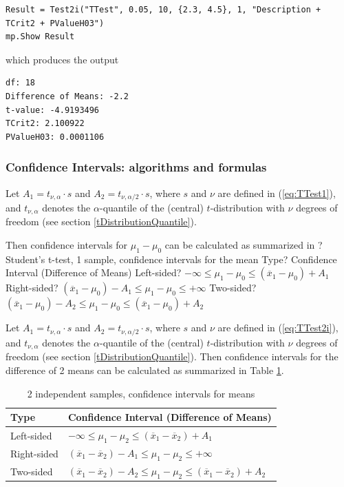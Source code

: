 \begin{lstlisting}
Result = Test2i("TTest", 0.05, 10, {2.3, 4.5}, 1, "Description + TCrit2 + PValueH03")
mp.Show Result
\end{lstlisting}
which produces the output

\begin{verbatim}
df: 18
Difference of Means: -2.2
t-value: -4.9193496
TCrit2: 2.100922
PValueH03: 0.0001106
\end{verbatim}




\subsubsection{Confidence Intervals: algorithms and formulas}
\label{1SampleTTest_CI}

Let $A_1=t_{\nu,\alpha} \cdot s$ and $A_2=t_{\nu,\alpha/2} \cdot s$, where $s$ and $\nu$ are defined in (\ref{eq:TTest1}), and $t_{\nu,\alpha}$ denotes the $\alpha$-quantile of the (central) $t$-distribution with $\nu$ degrees of freedom (see section \ref{tDistributionQuantile}). 


\mpTableTwoColsThreeRows
{Then confidence intervals for $\mu_1 - \mu_0$ can be calculated as summarized in ? Student's t-test, 1 sample, confidence intervals for the mean}
{Type? Confidence Interval (Difference of Means)}
{Left-sided? $-\infty \leq \mu_1 - \mu_0 \leq (\overline{x}_1-\mu_0)  + A_1$}
{Right-sided? $(\overline{x}_1-\mu_0 ) - A_1 \leq \mu_1 - \mu_0 \leq +\infty$}
{Two-sided? $(\overline{x}_1-\mu_0 ) - A_2 \leq \mu_1 - \mu_0 \leq (\overline{x}_1-\mu_0 ) + A_2$}


Let $A_1=t_{\nu,\alpha} \cdot s$ and $A_2=t_{\nu,\alpha/2} \cdot s$, where $s$ and $\nu$ are defined in (\ref{eq:TTest2i}), and $t_{\nu,\alpha}$ denotes the $\alpha$-quantile of the (central) $t$-distribution with $\nu$ degrees of freedom (see section \ref{tDistributionQuantile}). Then confidence intervals for the difference of 2 means can be calculated as summarized in Table \ref{TableStudentsttest,2i samples, CI}.

\begin{table}[ht]
	\centering
	\begin{tabular}{|l|l|}
		\hline
		Type & Confidence Interval (Difference of Means)\\
		\hline
		Left-sided &  $-\infty \leq \mu_1 - \mu_2 \leq (\overline{x}_1-\overline{x}_2) + A_1$ \\
		Right-sided &  $(\overline{x}_1-\overline{x}_2) - A_1 \leq \mu_1 - \mu_2 \leq +\infty$\\
		Two-sided & $(\overline{x}_1-\overline{x}_2) - A_2 \leq \mu_1 - \mu_2 \leq (\overline{x}_1-\overline{x}_2) + A_2$ \\
		\hline
	\end{tabular}
	\caption{2 independent samples, confidence intervals for means}
	\label{TableStudentsttest,2i samples, CI}
\end{table}


